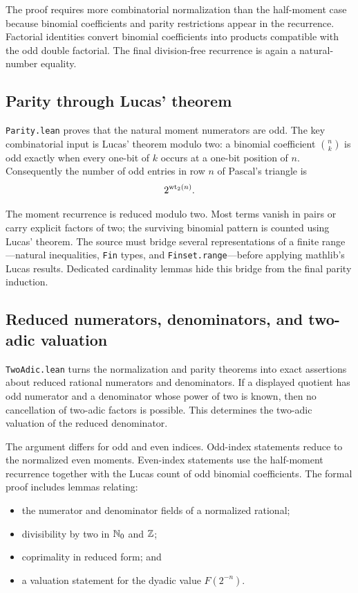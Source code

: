 \documentclass[11pt,oneside]{article}
\theoremstyle{definition}
\theoremstyle{remark}
\begin{document}
The proof requires more combinatorial normalization than the half-moment case because binomial coefficients and parity restrictions appear in the recurrence.  Factorial identities convert binomial coefficients into products compatible with the odd double factorial.  The final division-free recurrence is again a natural-number equality.

\subsection{Parity through Lucas' theorem}
\nolinkurl{Parity.lean} proves that the natural moment numerators are odd.  The key combinatorial input is Lucas' theorem modulo two: a binomial coefficient \(\binom nk\) is odd exactly when every one-bit of \(k\) occurs at a one-bit position of \(n\).  Consequently the number of odd entries in row \(n\) of Pascal's triangle is
\[
  2^{\operatorname{wt}_{2}(n)}.
\]

The moment recurrence is reduced modulo two.  Most terms vanish in pairs or carry explicit factors of two; the surviving binomial pattern is counted using Lucas' theorem.  The source must bridge several representations of a finite range---natural inequalities, \nolinkurl{Fin} types, and \nolinkurl{Finset.range}---before applying mathlib's Lucas results.  Dedicated cardinality lemmas hide this bridge from the final parity induction.

\subsection{Reduced numerators, denominators, and two-adic valuation}
\nolinkurl{TwoAdic.lean} turns the normalization and parity theorems into exact assertions about reduced rational numerators and denominators.  If a displayed quotient has odd numerator and a denominator whose power of two is known, then no cancellation of two-adic factors is possible.  This determines the two-adic valuation of the reduced denominator.

The argument differs for odd and even indices.  Odd-index statements reduce to the normalized even moments.  Even-index statements use the half-moment recurrence together with the Lucas count of odd binomial coefficients.  The formal proof includes lemmas relating:
\begin{itemize}
  \item the numerator and denominator fields of a normalized rational;
  \item divisibility by two in \(\mathbb{N}_{0}\) and \(\mathbb{Z}\);
  \item coprimality in reduced form; and
  \item a valuation statement for the dyadic value \(F(2^{-n})\).
\end{itemize}
\end{document}
